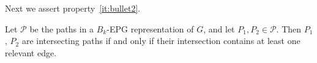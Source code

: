 \documentclass[runningheads]{llncs}
\begin{document}

Next we assert property~\ref{it:bullet2}.

\begin{lemma}\label{lem:relevantEdges}
Let $\mathcal{P}$ be the paths in a $B_k$-EPG representation of $G$, and let $P_1, P_2\in \mathcal{P}$. Then $P_1$, $P_2$ are intersecting paths if and only if their intersection contains at least one relevant edge.
\end{lemma}






\end{document}
